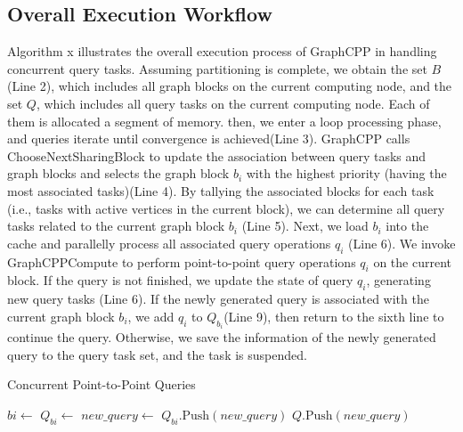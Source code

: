 \documentclass[lettersize,journal]{IEEEtran} %
\begin{document}
\subsection{Overall Execution Workflow}
Algorithm x illustrates the overall execution process of GraphCPP in handling concurrent query tasks. Assuming partitioning is complete, we obtain the set $B$(Line 2), which includes all graph blocks on the current computing node, and the set $Q$, which includes all query tasks on the current computing node. Each of them is allocated a segment of memory. then, we enter a loop processing phase, and queries iterate until convergence is achieved(Line 3). GraphCPP calls ChooseNextSharingBlock to update the association between query tasks and graph blocks and selects the graph block $b_i$ with the highest priority (having the most associated tasks)(Line 4). By tallying the associated blocks for each task (i.e., tasks with active vertices in the current block), we can determine all query tasks related to the current graph block $b_i$ (Line 5). Next, we load $b_i$ into the cache and parallelly process all associated query operations $q_i$ (Line 6). We invoke GraphCPPCompute to perform point-to-point query operations $q_i$ on the current block. If the query is not finished, we update the state of query $q_i$, generating new query tasks (Line 6). If the newly generated query is associated with the current graph block $b_i$, we add $q_i$ to ${Q_{b_i}}$(Line 9), then return to the sixth line to continue the query. Otherwise, we save the information of the newly generated query to the query task set, and the task is suspended.

\begin{algorithm}
\caption{Concurrent Point-to-Point Queries}
\label{alg:concurrent_queries}
\begin{algorithmic}[1]

    \State {} 
        \State $bi \gets$ 
        \State $Q_{bi} \gets$ 
         
            \State $new\_query \gets$  
                \State $Q_{bi}.\text{Push}(new\_query)$
            \Else
                \State $Q.\text{Push}(new\_query)$
            \EndIf
        \EndFor
    \EndWhile
\EndFunction

\end{algorithmic}
\end{algorithm}
  
\end{document}
